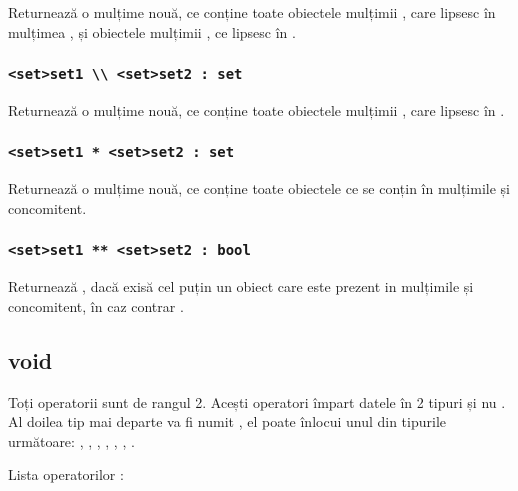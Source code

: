 Returnează o mulțime nouă, ce conține toate obiectele mulțimii , care lipsesc în mulțimea , și obiectele mulțimii , ce lipsesc în .

\subsubsection{\lstinline|<set>set1 \\ <set>set2 : set|}

Returnează o mulțime nouă, ce conține toate obiectele mulțimii , care lipsesc în .

\subsubsection{\lstinline|<set>set1 * <set>set2 : set|}

Returnează o mulțime nouă, ce conține toate obiectele ce se conțin în mulțimile  și  concomitent.

\subsubsection{\lstinline|<set>set1 ** <set>set2 : bool|}

Returnează \true, dacă exisă cel puțin un obiect care este prezent in mulțimile  și  concomitent, în caz contrar \false.

\subsection{\color{lightblue}void}

Toți operatorii \void{} sunt de rangul 2. Acești operatori împart datele în 2 tipuri \void{} și nu \void{}. Al doilea tip mai departe va fi numit , el poate înlocui unul din tipurile următoare: \integer{}, \double{}, \str{}, \listtype{}, \object{}, \set{}, \element{}.

Lista operatorilor \void{}:

